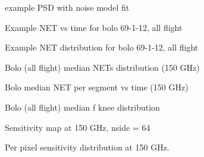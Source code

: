 \documentclass[../EBEXPaper2.tex]{subfiles}
\begin{document}
\begin{figure}
\caption{example PSD with noise model fit}
\end{figure}

\begin{figure}
\caption{Example NET vs time for bolo 69-1-12, all flight}
\end{figure}

\begin{figure}
\caption{Example NET distribution for bolo 69-1-12, all flight}
\end{figure}

\begin{figure}
\caption{Bolo (all flight) median NETs distribution (150 GHz)}
\end{figure}

\begin{figure}
\caption{Bolo median NET per segment vs time (150 GHz)}
\end{figure}

\begin{figure}
\caption{Bolo (all flight) median f knee distribution}
\end{figure}

\begin{figure}
\caption{Sensitivity map at 150 GHz, nside = 64}
\end{figure}

\begin{figure}
\caption{Per pixel sensitivity distribution at 150 GHz.}
\end{figure}
%
\end{document}
